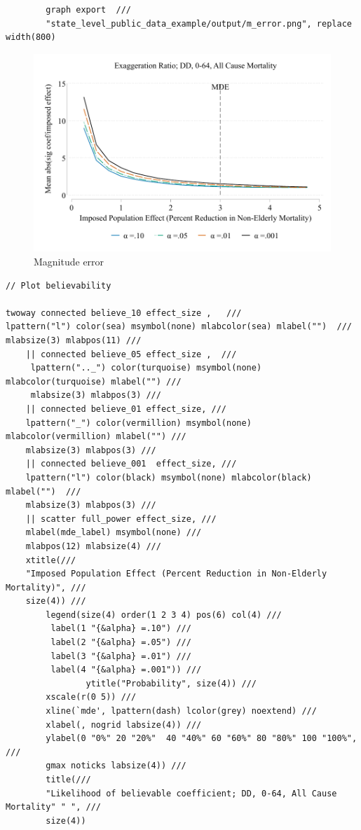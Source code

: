 \documentclass[12pt]{article}%
\begin{document}
\begin{appendices}
\begin{footnotesize}
\begin{verbatim}
        graph export  /// 
        "state_level_public_data_example/output/m_error.png", replace width(800)
\end{verbatim}
\end{footnotesize}

\FloatBarrier



\begin{figure}
  \caption{Magnitude error}
      \includegraphics[width=\linewidth]{../state_level_public_data_example/output/m_error.pdf}  
\end{figure}

\FloatBarrier
\begin{footnotesize}
\begin{verbatim}
// Plot believability

twoway connected believe_10 effect_size ,   /// 
lpattern("l") color(sea) msymbol(none) mlabcolor(sea) mlabel("")  /// 
mlabsize(3) mlabpos(11) ///
    || connected believe_05 effect_size ,  /// 
     lpattern(".._") color(turquoise) msymbol(none) mlabcolor(turquoise) mlabel("") /// 
     mlabsize(3) mlabpos(3) ///
    || connected believe_01 effect_size, /// 
    lpattern("_") color(vermillion) msymbol(none) mlabcolor(vermillion) mlabel("") /// 
    mlabsize(3) mlabpos(3) ///
    || connected believe_001  effect_size, /// 
    lpattern("l") color(black) msymbol(none) mlabcolor(black) mlabel("")  /// 
    mlabsize(3) mlabpos(3) ///
    || scatter full_power effect_size, /// 
    mlabel(mde_label) msymbol(none) /// 
    mlabpos(12) mlabsize(4) ///
    xtitle(///
    "Imposed Population Effect (Percent Reduction in Non-Elderly Mortality)", /// 
    size(4)) ///
        legend(size(4) order(1 2 3 4) pos(6) col(4) ///
         label(1 "{&alpha} =.10") ///
         label(2 "{&alpha} =.05") ///
         label(3 "{&alpha} =.01") ///
         label(4 "{&alpha} =.001")) ///
                ytitle("Probability", size(4)) ///
        xscale(r(0 5)) ///
        xline(`mde', lpattern(dash) lcolor(grey) noextend) ///
        xlabel(, nogrid labsize(4)) ///
        ylabel(0 "0%" 20 "20%"  40 "40%" 60 "60%" 80 "80%" 100 "100%", /// 
        gmax noticks labsize(4)) ///
        title(///
        "Likelihood of believable coefficient; DD, 0-64, All Cause Mortality" " ", /// 
        size(4)) 


\end{verbatim}
\end{footnotesize}
\end{appendices}
\end{document}
